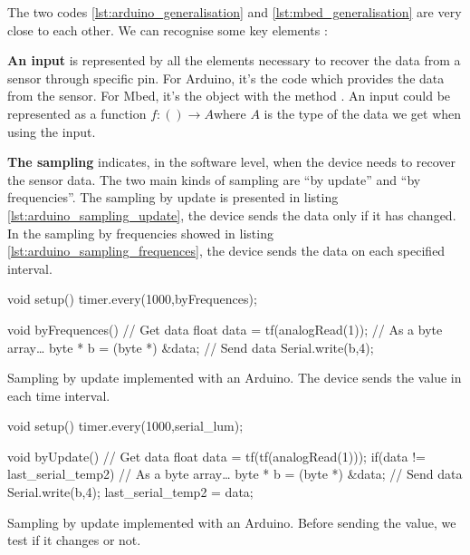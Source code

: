 The two codes \ref{lst:arduino_generalisation} and \ref{lst:mbed_generalisation}
are very close to each other. We can recognise some key elements :

\textbf{An input} is represented by all the elements necessary to recover the
data from a sensor through specific pin. For Arduino, it's the code
 which provides the data from the sensor. For
Mbed, it's the object  with the method .
An input could be represented as a function $f : () \rightarrow A$where $A$ is
the type of the data we get when using the input.

\textbf{The sampling} indicates, in the software level, when the device needs
to recover the sensor data. The two main kinds of sampling are ``by update''
and ``by frequencies''. The sampling by update is presented in
listing \ref{lst:arduino_sampling_update}, the device sends the data only if it has
changed. In the sampling by frequencies showed in listing
\ref{lst:arduino_sampling_frequences}, the device sends the data on each
specified interval.

\begin{listing}[H]
  \centering
\begin{scalacode}
void setup(){
  timer.every(1000,byFrequences);
}

void byFrequences(){
  // Get data
  float data = tf(analogRead(1));
  // As a byte array…
  byte * b = (byte *) &data;
  // Send data
  Serial.write(b,4);
}
\end{scalacode}
  \caption[Sampling by frequencies implemented with an Arduino]{Sampling by update
    implemented with an Arduino. The device sends the value in each time interval.}
  \label{lst:arduino_sampling_update}
\end{listing}

\begin{listing}[H]
  \centering
\begin{scalacode}
void setup(){
  timer.every(1000,serial_lum);
}

void byUpdate(){
  // Get data
  float data = tf(tf(analogRead(1)));
  if(data != last_serial_temp2) {
    // As a byte array…
    byte * b = (byte *) &data;
    // Send data
    Serial.write(b,4);
  }
  last_serial_temp2 = data;
}
\end{scalacode}
  \caption[Sampling by update implemented with an Arduino]{Sampling by update
    implemented with an Arduino. Before sending the value, we test if it
    changes or not.}
  \label{lst:arduino_sampling_frequences}
\end{listing}

